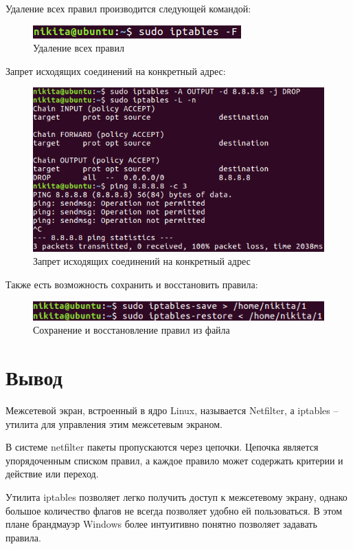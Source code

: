 \documentclass[14pt,a4paper,report]{report}
\begin{document}
Удаление всех правил производится следующей командой:

\begin{figure}[h!]
	\centering
	\includegraphics[scale = 1.35]{images/4.png}
	\caption{Удаление всех правил}
	\label{image:4}
\end{figure}

Запрет исходящих соединений на конкретный адрес:

\begin{figure}[h!]
	\centering
	\includegraphics[scale = 1.05]{images/5.png}
	\caption{Запрет исходящих соединений на конкретный адрес}
	\label{image:5}
\end{figure}

Также есть возможность сохранить и восстановить правила:

\begin{figure}[h!]
	\centering
	\includegraphics[scale = 1.25]{images/6.png}
	\caption{Сохранение и восстановление правил из файла}
	\label{image:6}
\end{figure}

\section{Вывод}

Межсетевой экран, встроенный в ядро Linux, называется Netfilter, а iptables -- утилита для управления этим межсетевым экраном.

В системе netfilter пакеты пропускаются через цепочки. Цепочка является упорядоченным списком правил, а каждое правило может содержать критерии и действие или переход.

Утилита iptables позволяет легко получить доступ к межсетевому экрану, однако большое количество флагов не всегда позволяет удобно ей пользоваться. В этом плане брандмауэр Windows более интуитивно понятно позволяет задавать правила.
\end{document}
